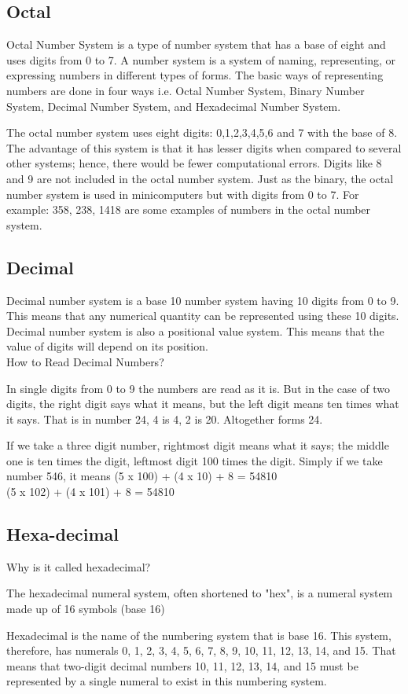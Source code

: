 \documentclass[11pt,a4paper,twoside]{article}
\begin{document}
\subsection{Octal}
Octal Number System is a type of number system that has a base of eight and uses digits from 0 to 7. A number system is a system of naming, representing, or expressing numbers in different types of forms. The basic ways of representing numbers are done in four ways i.e. Octal Number System, Binary Number System, Decimal Number System, and Hexadecimal Number System.\par
The octal number system uses eight digits: 0,1,2,3,4,5,6 and 7 with the base of 8. The advantage of this system is that it has lesser digits when compared to several other systems; hence, there would be fewer computational errors. Digits like 8 and 9 are not included in the octal number system. Just as the binary, the octal number system is used in minicomputers but with digits from 0 to 7. For example: 358, 238, 1418 are some examples of numbers in the octal number system.
\subsection{Decimal}
Decimal number system is a base 10 number system having 10 digits from 0 to 9. This means that any numerical quantity can be represented using these 10 digits. Decimal number system is also a positional value system. This means that the value of digits will depend on its position.\\
How to Read Decimal Numbers?\par
In single digits from 0 to 9 the numbers are read as it is. But in the case of two digits, the right digit says what it means, but the left digit means ten times what it says. That is in number 24, 4 is 4, 2 is 20. Altogether forms 24.\par
If we take a three digit number, rightmost digit means what it says; the middle one is ten times the digit, leftmost digit 100 times the digit. Simply if we take number 546, it means (5 x 100) + (4 x 10) + 8 = 54810 \\
(5 x 102) + (4 x 101) + 8 = 54810
\subsection{Hexa-decimal}
Why is it called hexadecimal?\par
The hexadecimal numeral system, often shortened to "hex", is a numeral system made up of 16 symbols (base 16)\par
Hexadecimal is the name of the numbering system that is base 16. This system, therefore, has numerals 0, 1, 2, 3, 4, 5, 6, 7, 8, 9, 10, 11, 12, 13, 14, and 15. That means that two-digit decimal numbers 10, 11, 12, 13, 14, and 15 must be represented by a single numeral to exist in this numbering system.
\newpage
\end{document}
